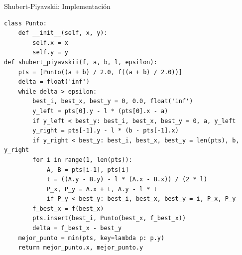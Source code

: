 \begin{frame}[fragile]{Shubert-Piyavskii: Implementación}
    \begin{lstlisting}[basicstyle=\ttfamily\tiny]
class Punto:
    def __init__(self, x, y):
        self.x = x
        self.y = y
def shubert_piyavskii(f, a, b, l, epsilon):
    pts = [Punto((a + b) / 2.0, f((a + b) / 2.0))]
    delta = float('inf')
    while delta > epsilon:
        best_i, best_x, best_y = 0, 0.0, float('inf')
        y_left = pts[0].y - l * (pts[0].x - a)
        if y_left < best_y: best_i, best_x, best_y = 0, a, y_left
        y_right = pts[-1].y - l * (b - pts[-1].x)
        if y_right < best_y: best_i, best_x, best_y = len(pts), b, y_right
        for i in range(1, len(pts)):
            A, B = pts[i-1], pts[i]
            t = ((A.y - B.y) - l * (A.x - B.x)) / (2 * l)
            P_x, P_y = A.x + t, A.y - l * t
            if P_y < best_y: best_i, best_x, best_y = i, P_x, P_y
        f_best_x = f(best_x)
        pts.insert(best_i, Punto(best_x, f_best_x))
        delta = f_best_x - best_y
    mejor_punto = min(pts, key=lambda p: p.y)
    return mejor_punto.x, mejor_punto.y
    \end{lstlisting}
\end{frame}


